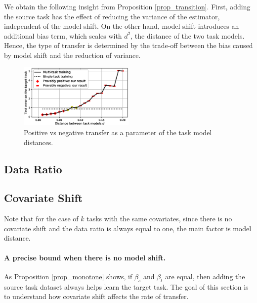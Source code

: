 We obtain the following insight from Proposition \ref{prop_transition}.
First, adding the source task has the effect of reducing the variance of the estimator, independent of the model shift.
On the other hand, model shift introduces an additional bias term, which scales with $d^2$, the distance of the two task models.
Hence, the type of transfer is determined by the trade-off between the bias caused by model shift and the reduction of variance.


\begin{figure}
	\centering
	\includegraphics[width=0.5\textwidth]{figures/model_shift_phase_transition.eps}
	\caption{Positive vs negative transfer as a parameter of the task model distances.}
	\label{fig_model_shift_phasetrans}
\end{figure}



\subsection{Data Ratio}



\subsection{Covariate Shift}


Note that for the case of $k$ tasks with the same covariates, since there is no covariate shift and the data ratio is always equal to one, the main factor is model distance. 

\paragraph{A precise bound when there is no model shift.}
As Proposition \ref{prop_monotone} shows, if $\beta_s$ and $\beta_t$ are equal, then adding the source task dataset always helps learn the target task.
The goal of this section is to understand how covariate shift affects the rate of transfer. 

